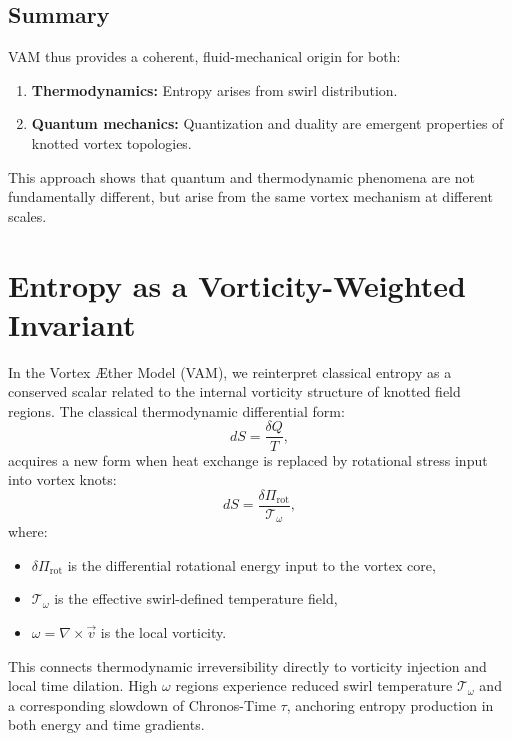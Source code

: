 \subsection{Summary}

VAM thus provides a coherent, fluid-mechanical origin for both:

\begin{enumerate}
    \item \textbf{Thermodynamics:} Entropy arises from swirl distribution.
    \item \textbf{Quantum mechanics:} Quantization and duality are emergent properties of knotted vortex topologies.
\end{enumerate}

This approach shows that quantum and thermodynamic phenomena are not fundamentally different, but arise from the same vortex mechanism at different scales.

\section*{Entropy as a Vorticity-Weighted Invariant}\label{sec:entropy_vorticity}

In the Vortex Æther Model (VAM), we reinterpret classical entropy as a conserved scalar related to the internal vorticity structure of knotted field regions. The classical thermodynamic differential form:
\begin{equation}
    dS = \frac{\delta Q}{T},
\end{equation}
acquires a new form when heat exchange is replaced by rotational stress input into vortex knots:
\begin{equation}
    dS = \frac{\delta \Pi_\text{rot}}{\mathcal{T}_\omega},
\end{equation}
where:
\begin{itemize}
    \item $\delta \Pi_\text{rot}$ is the differential rotational energy input to the vortex core,
    \item $\mathcal{T}_\omega$ is the effective swirl-defined temperature field,
    \item $\omega = \nabla \times \vec{v}$ is the local vorticity.
\end{itemize}
This connects thermodynamic irreversibility directly to vorticity injection and local time dilation.
High $\omega$ regions experience reduced swirl temperature $\mathcal{T}_\omega$ and a corresponding slowdown of Chronos-Time $\tau$, anchoring entropy production in both energy and time gradients.


